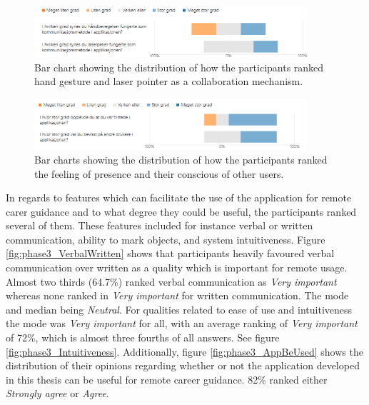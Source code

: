 \begin{figure}[H]
  \centering
   \captionsetup{width=.8\linewidth}
    \includegraphics[width=0.9\textwidth]{fig/phase_3/survey/collabMechanisimsGestureLaser.png}
 \caption{Bar chart showing the distribution of how the participants ranked hand gesture and laser pointer as a collaboration mechanism.}
\label{fig:phase3_CollabHandGestures}
\end{figure}


\begin{figure}[H]
  \centering
   \captionsetup{width=.8\linewidth}
    \includegraphics[width=0.9\textwidth]{fig/phase_3/survey/socialPrecense.png}
 \caption{Bar charts showing the distribution of how the participants ranked the feeling of presence and their 
conscious of other users.}
\label{fig:phase3_socialPresence}
\end{figure}


In regards to features which can facilitate the use of the application for remote carer guidance and to what degree they could be useful, the participants ranked several of them. These features included for instance verbal or written communication, ability to mark objects, and system intuitiveness. Figure \ref{fig:phase3_VerbalWritten} shows that participants heavily favoured verbal communication over written as a quality which is important for remote usage. Almost two thirds (64.7\%) ranked verbal communication as \textit{Very important} whereas none ranked in \textit{Very important} for written communication. The mode and median being \textit{Neutral}.
For qualities related to ease of use and intuitiveness the mode was \textit{Very important} for all, with an average ranking of \textit{Very important} of 72\%, which is almost three fourths of all answers.  See figure \ref{fig:phase3_Intuitiveness}.   
Additionally,  figure \ref{fig:phase3_AppBeUsed} shows the distribution of their opinions regarding whether or not the application developed in this thesis can be useful for remote career guidance. 82\% ranked either \textit{Strongly agree} or \textit{Agree}.


